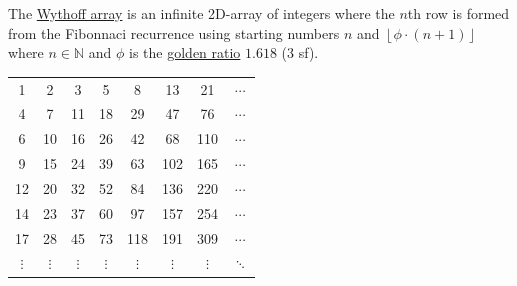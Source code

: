 \documentclass[addpoints]{exam}
\begin{document}
\begin{questions}
The \href{http://www.maths.surrey.ac.uk/hosted-sites/R.Knott/Fibonacci/fibGen.html#section6.2}{Wythoff array} is an infinite 2D-array of integers where the $n$th row is formed from the Fibonnaci recurrence using starting numbers $n$ and $\left \lfloor{\phi\cdot (n+1)}\right \rfloor$ where $n \in \mathbb{N}$ and $\phi$ is the \href{https://en.wikipedia.org/wiki/Golden_ratio}{golden ratio} $1.618$ (3 sf).

\begin{center}
\begin{tabular}{c c c c c c c c}
 \cellcolor{blue!25}1 & 2 & 3 & 5 & 8 & 13 & 21 & $\cdots$\\
 4 & \cellcolor{blue!25}7 & 11 & 18 & 29 & 47 & 76 & $\cdots$\\
 6 & 10 & \cellcolor{blue!25}16 & 26 & 42 & 68 & 110 & $\cdots$\\
 9 & 15 & 24 & \cellcolor{blue!25}39 & 63 & 102 & 165 & $\cdots$ \\
 12 & 20 & 32 & 52 & \cellcolor{blue!25}84 & 136 & 220 & $\cdots$ \\
 14 & 23 & 37 & 60 & 97 & \cellcolor{blue!25}157 & 254 & $\cdots$\\
 17 & 28 & 45 & 73 & 118 & 191 & \cellcolor{blue!25}309 & $\cdots$\\
 $\vdots$ & $\vdots$ & $\vdots$ & $\vdots$ & $\vdots$ & $\vdots$ & $\vdots$ & \color{blue}$\ddots$\\
 

\end{tabular}
\end{center}


\end{questions}
\end{document}
